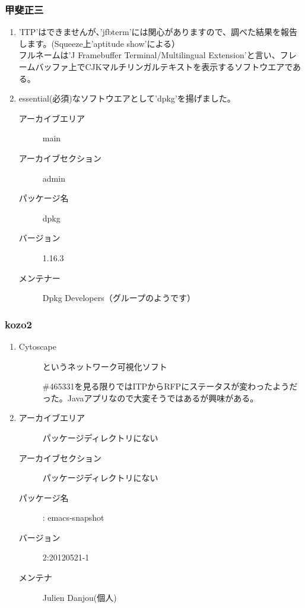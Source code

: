 \documentclass[cjk,dvipdfmx,10pt,%
hyperref={bookmarks=true,bookmarksnumbered=true,bookmarksopen=false,%
colorlinks=false,%
pdftitle={第 59 回 関西 Debian 勉強会},%
pdfauthor={倉敷・のがた・かわだ・佐々木},%
pdfsubject={資料},%
}]{beamer}
\begin{document}
\begin{frame}
\frametitle{ 甲斐正三 }
  \begin{enumerate}
  \item 
    'ITP'はできませんが、'jfbterm'には関心がありますので、調べた結果を報告します。(Squeeze上'aptitude show'による）\\
    フルネームは'J Framebuffer Terminal/Multilingual Extension'と言い、フレームバッファ上でCJKマルチリンガルテキストを表示するソフトウエアである。
    \item essential(必須)なソフトウエアとして'dpkg'を揚げました。
      \begin{description}
      \item [アーカイブエリア] main
      \item [アーカイブセクション] admin
      \item [パッケージ名] dpkg
      \item [バージョン] 1.16.3
      \item [メンテナー] Dpkg Developers（グループのようです）
      \end{description}
  \end{enumerate}
\end{frame}

\begin{frame}
 \frametitle{ kozo2 }
  \begin{enumerate}
  \item
    \begin{description}
    \item [Cytoscape] というネットワーク可視化ソフト

      \#465331を見る限りではITPからRFPにステータスが変わったようだった。Javaアプリなので大変そうではあるが興味がある。
    \end{description}
  \item
    \begin{description}
    \item [アーカイブエリア] パッケージディレクトリにない
    \item [アーカイブセクション] パッケージディレクトリにない
    \item [パッケージ名]: emacs-snapshot
    \item [バージョン] 2:20120521-1
    \item [メンテナ] Julien Danjou(個人)
    \end{description}
  \end{enumerate}
\end{frame}
\end{document}
